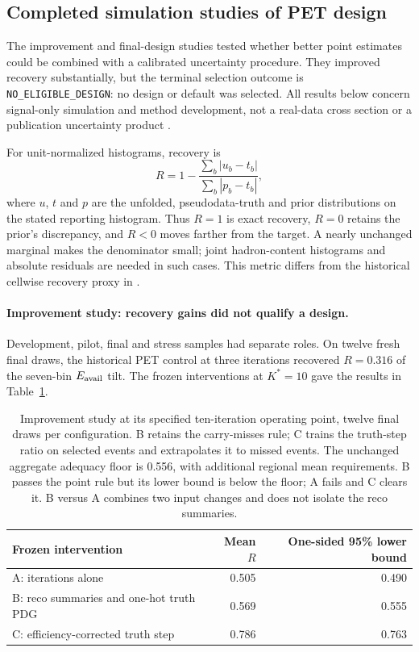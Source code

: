 \subsection{Completed simulation studies of PET design}
\label{sec:pet-campaigns}

The improvement and final-design studies tested whether better point estimates could be combined with a calibrated uncertainty procedure. They improved recovery substantially, but the terminal selection outcome is \texttt{NO\_ELIGIBLE\_DESIGN}: no design or default was selected. All results below concern signal-only simulation and method development, not a real-data cross section or a publication uncertainty product \cite{PETImprovement2026,PETFinalDesign2026}.

For unit-normalized histograms, recovery is
\begin{equation}
 R=1-\frac{\sum_b|u_b-t_b|}{\sum_b|p_b-t_b|},
 \label{eq:pet-campaign-recovery}
\end{equation}
where $u$, $t$ and $p$ are the unfolded, pseudodata-truth and prior distributions on the stated reporting histogram. Thus $R=1$ is exact recovery, $R=0$ retains the prior's discrepancy, and $R<0$ moves farther from the target. A nearly unchanged marginal makes the denominator small; joint hadron-content histograms and absolute residuals are needed in such cases. This metric differs from the historical cellwise recovery proxy in .

\paragraph{Improvement study: recovery gains did not qualify a design.} Development, pilot, final and stress samples had separate roles. On twelve fresh final draws, the historical PET control at three iterations recovered $R=0.316$ of the seven-bin $E_{\mathrm{avail}}$ tilt. The frozen interventions at $K^*=10$ gave the results in Table~\ref{tab:pet-improvement}.

\begin{table}[htbp]
\centering
\small
\begin{tabular}{@{}lrr@{}}
\toprule
Frozen intervention & Mean $R$ & One-sided 95\% lower bound \\
\midrule
A: iterations alone & 0.505 & 0.490 \\
B: reco summaries and one-hot truth PDG & 0.569 & 0.555 \\
C: efficiency-corrected truth step & 0.786 & 0.763 \\
\bottomrule
\end{tabular}
\caption{Improvement study at its specified ten-iteration operating point, twelve final draws per configuration. B retains the carry-misses rule; C trains the truth-step ratio on selected events and extrapolates it to missed events. The unchanged aggregate adequacy floor is 0.556, with additional regional mean requirements. B passes the point rule but its lower bound is below the floor; A fails and C clears it. B versus A combines two input changes and does not isolate the reco summaries.}
\label{tab:pet-improvement}
\end{table}

